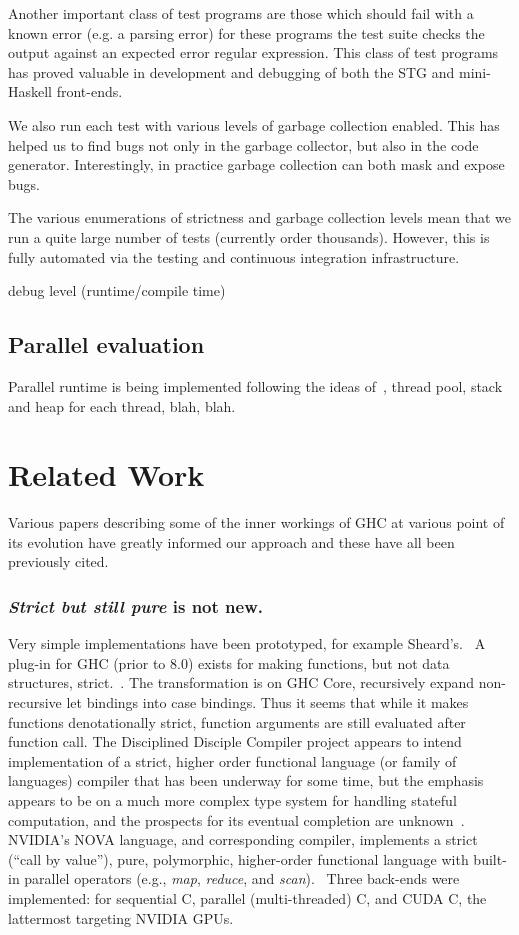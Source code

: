 \documentclass{llncs}
\begin{document}
Another important class of test programs are those which should fail with a
known error (e.g. a parsing error) for these programs the test suite checks
the output against an expected error regular expression. This class of test
programs has proved valuable in development and debugging of both the STG
and mini-Haskell front-ends.

We also run each test with various levels of garbage collection enabled. This
has helped us to find bugs not only in the garbage collector, but also in the
code generator.  Interestingly, in practice garbage collection can both mask
and expose bugs.

The various enumerations of strictness and garbage collection levels mean that
we run a quite large number of tests (currently order thousands). However,
this is fully automated via the testing and continuous integration
infrastructure.

debug level (runtime/compile time)

\subsection{Parallel evaluation}

Parallel runtime is being implemented following the ideas
of~\cite{SPJs-many-papers}, thread pool, stack and heap for each thread, blah,
blah.

\section{Related Work}

Various papers describing some of the inner workings of GHC at various point
of its evolution have greatly informed our approach and these have all been
previously cited.

\subsubsection{\emph{Strict but still pure} is not new.}
Very simple implementations have been prototyped, for example
Sheard's.~\cite{Sheard:2003}
%
A plug-in for GHC (prior to 8.0) exists for making functions, but not data
structures, strict.~\cite{strict-ghc-plugin}.  The transformation is on GHC
Core, recursively expand non-recursive let bindings into case bindings.  Thus
it seems that while it makes functions denotationally strict, function arguments
are still evaluated after function call.
%
The Disciplined Disciple Compiler project appears to intend implementation of
a strict, higher order functional language (or family of languages) compiler
that has been underway for some time, but the emphasis appears to be on a much
more complex type system for handling stateful computation, and the prospects
for its eventual completion are unknown~\cite{disciplined-disciple}.
%
NVIDIA's NOVA language, and corresponding compiler, implements a strict
(``call by value''), pure, polymorphic, higher-order functional language with
built-in parallel operators (e.g., \emph{map}, \emph{reduce}, and
\emph{scan}).~\cite{NVIDIA:2013} Three back-ends were implemented: for
sequential C, parallel (multi-threaded) C, and CUDA C, the lattermost
targeting NVIDIA GPUs.
\end{document}
